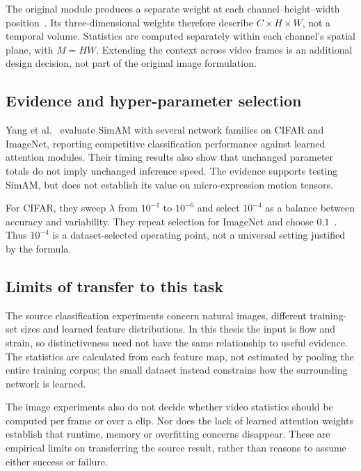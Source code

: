 The original module produces a separate weight at each channel--height--width position~\cite{yang2021}. Its three-dimensional weights therefore describe $C\times H\times W$, not a temporal volume. Statistics are computed separately within each channel's spatial plane, with $M=HW$. Extending the context across video frames is an additional design decision, not part of the original image formulation.

\subsection{Evidence and hyper-parameter selection}
\label{sec:simam-evidence}

Yang et al.~\cite{yang2021} evaluate SimAM with several network families on CIFAR and ImageNet, reporting competitive classification performance against learned attention modules. Their timing results also show that unchanged parameter totals do not imply unchanged inference speed. The evidence supports testing SimAM, but does not establish its value on micro-expression motion tensors.

For CIFAR, they sweep $\lambda$ from $10^{-1}$ to $10^{-6}$ and select $10^{-4}$ as a balance between accuracy and variability. They repeat selection for ImageNet and choose $0.1$~\cite{yang2021}. Thus $10^{-4}$ is a dataset-selected operating point, not a universal setting justified by the formula.

\subsection{Limits of transfer to this task}
\label{sec:simam-limitations}

The source classification experiments concern natural images, different training-set sizes and learned feature distributions. In this thesis the input is flow and strain, so distinctiveness need not have the same relationship to useful evidence. The statistics are calculated from each feature map, not estimated by pooling the entire training corpus; the small dataset instead constrains how the surrounding network is learned.

The image experiments also do not decide whether video statistics should be computed per frame or over a clip. Nor does the lack of learned attention weights establish that runtime, memory or overfitting concerns disappear. These are empirical limits on transferring the source result, rather than reasons to assume either success or failure.

